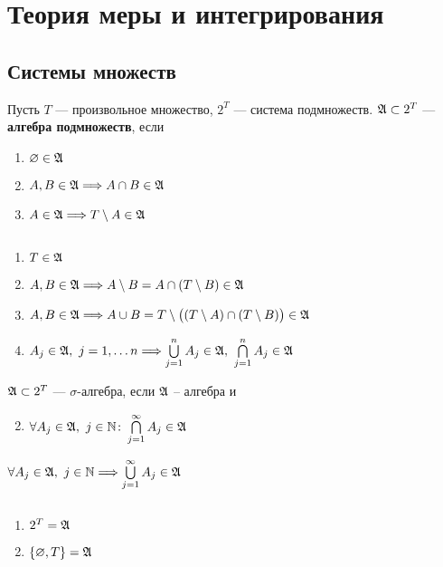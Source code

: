 \chapter{Теория меры и интегрирования}
\section{Системы множеств}

\begin{defn}
    Пусть $ T$ --- произвольное множество, $ 2^{T}$ --- система подмножеств. $ \mathfrak{A} \subset 2^{T}$ --- {\bf алгебра подмножеств}, если 
\begin{enumerate}[label=(\roman*),noitemsep]
    \item  $ \varnothing \in \mathfrak{A}$
	\item $ A, B \in \mathfrak{A} \Longrightarrow  A \cap B \in \mathfrak{A}$

	\item $ A \in \mathfrak{A} \Longrightarrow T \setminus A \in \mathfrak{A} $
\end{enumerate} 
\end{defn}
\begin{prop}
	$ $
	\begin{enumerate}[noitemsep]
        \item $ T \in \mathfrak{A}$
		\item $ A, B \in \mathfrak{A} \Longrightarrow A \setminus B  = A \cap (T \setminus B) \in \mathfrak{A}$
		\item $ A, B \in \mathfrak{A} \Longrightarrow A \cup B = T \setminus \bigl( (T\setminus A) \cap (T \setminus B) \bigr) \in \mathfrak{A}$
		\item $ A_j \in \mathfrak{A}, ~ j = 1,\ldots n \Longrightarrow \bigcup\limits_{j=1}^{n} A_j \in \mathfrak{A}, ~ \bigcap\limits_{j=1}^{n}A_j \in \mathfrak{A}$
    \end{enumerate} 
\end{prop}
\begin{defn}
	$ \mathfrak{A} \subset 2^{T}$ --- $ \sigma $-алгебра, если $ \mathfrak{A}$ -- алгебра и 
	\begin{enumerate}[label=(\roman* $\sigma$),noitemsep]
		\setcounter{enumi}{1}
	    \item $ \forall A_j \in \mathfrak{A},~ j \in \mathbb{N}\colon \bigcap\limits_{j=1}^{\infty} A_j \in \mathfrak{A}$
	\end{enumerate} 
	\begin{note}
	    $ \forall A_j \in \mathfrak{A}, ~ j \in \mathbb{N} \Longrightarrow \bigcup\limits_{j=1}^{\infty} A_j \in \mathfrak{A}$
	\end{note}
\end{defn}
\begin{ex}
	$ $
	\begin{enumerate}[noitemsep]
	    \item $ 2^{T} = \mathfrak{A}$ 
		\item $ \{\varnothing, T\} = \mathfrak{A}$
	\end{enumerate} 
\end{ex}

